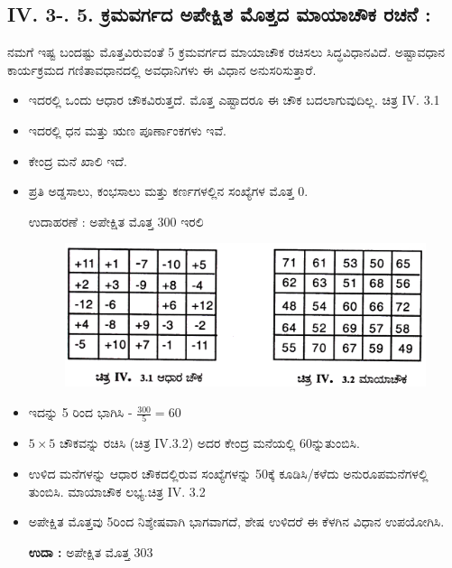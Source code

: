 \subsection*{IV. 3-. 5. ಕ್ರಮವರ್ಗದ ಅಪೇಕ್ಷಿತ ಮೊತ್ತದ ಮಾಯಾಚೌಕ ರಚನೆ :}

ನಮಗೆ ಇಷ್ಟ ಬಂದಷ್ಟು ಮೊತ್ತವಿರುವಂತೆ 5 ಕ್ರಮವರ್ಗದ ಮಾಯಾಚೌಕ ರಚಿಸಲು ಸಿದ್ಧ\break ವಿಧಾನವಿದೆ. ಅಷ್ಟಾವಧಾನ ಕಾರ್ಯಕ್ರಮದ ಗಣಿತಾವಧಾನದಲ್ಲಿ ಅವಧಾನಿಗಳು ಈ ವಿಧಾನ ಅನುಸರಿಸುತ್ತಾರೆ.
\begin{itemize}
	\item ಇದರಲ್ಲಿ ಒಂದು ಆಧಾರ ಚೌಕವಿರುತ್ತದೆ. ಮೊತ್ತ ಎಷ್ಟಾದರೂ ಈ ಚೌಕ ಬದಲಾಗುವುದಿಲ್ಲ. ಚಿತ್ರ IV. 3.1
	\item ಇದರಲ್ಲಿ ಧನ ಮತ್ತು ಋಣ ಪೂರ್ಣಾಂಕಗಳು ಇವೆ.
	\item ಕೇಂದ್ರ ಮನೆ ಖಾಲಿ ಇದೆ.
	\item ಪ್ರತಿ ಅಡ್ಡಸಾಲು, ಕಂಭಸಾಲು ಮತ್ತು ಕರ್ಣಗಳಲ್ಲಿನ ಸಂಖ್ಯೆಗಳ ಮೊತ್ತ 0.

\newpage

	ಉದಾಹರಣೆ : ಅಪೇಕ್ಷಿತ ಮೊತ್ತ 300 ಇರಲಿ
	\begin{figure}[H]
	\includegraphics[scale=.9]{src/figures/chap3/fig3.41.jpg}
	\end{figure}
	\item ಇದನ್ನು 5 ರಿಂದ ಭಾಗಿಸಿ - $\frac{300}{5}=60$
	\item $5 \times 5$ ಚೌಕವನ್ನು ರಚಿಸಿ (ಚಿತ್ರ IV.3.2) ಅದರ ಕೇಂದ್ರ ಮನೆಯಲ್ಲಿ 60ನ್ನು\break ತುಂಬಿಸಿ.
	\item ಉಳಿದ ಮನೆಗಳನ್ನು ಆಧಾರ ಚೌಕದಲ್ಲಿರುವ ಸಂಖ್ಯೆಗಳನ್ನು 50ಕ್ಕೆ ಕೂಡಿಸಿ/ಕಳೆದು ಅನುರೂಪಮನೆಗಳಲ್ಲಿ ತುಂಬಿಸಿ. ಮಾಯಾಚೌಕ ಲಭ್ಯ.ಚಿತ್ರ IV. 3.2
	\item ಅಪೇಕ್ಷಿತ ಮೊತ್ತವು 5ರಿಂದ ನಿಶ್ಶೇಷವಾಗಿ ಭಾಗವಾಗದೆ, ಶೇಷ ಉಳಿದರೆ ಈ ಕೆಳಗಿನ ವಿಧಾನ ಉಪಯೋಗಿಸಿ.

	\textbf{ಉದಾ :} ಅಪೇಕ್ಷಿತ ಮೊತ್ತ 303

\smallskip


\end{itemize}
